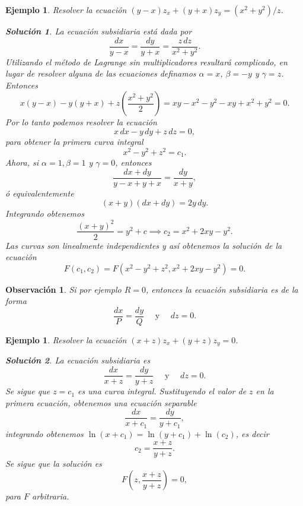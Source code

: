 \documentclass[11pt,letterpaper,draft]{report}
\newtheorem{example}[defn]{Ejemplo}
\newtheorem*{sol}{Solución}
\newtheorem{obs}[defn]{Observación}
\newcommand\<{\langle}
\renewcommand\>{\rangle}
\begin{document}
\begin{example}
  Resolver la ecuación $(y-x) z_x + (y+x) z_y = (x^2+y^2) /
  z$.
  \begin{sol}
    La ecuación subsidiaria está dada por
    \[
    \frac{dx}{y-x} = \frac{dy}{y+x} = \frac{z \,
    dz}{x^2+y^2}.
    \] 
    Utilizando el método de Lagrange sin multiplicadores
    resultará complicado, en lugar de resolver alguna de las
    ecuaciones definamos $\alpha = x$, $\beta = -y$ y
    $\gamma = z$. Entonces
    \[
    x(y-x) - y(y+x) + z\left(\frac{x^2+y^2}{2}\right) = xy -
    x^2 - y^2 - xy + x^2 + y^2 = 0.
    \]
    Por lo tanto podemos resolver la ecuación
    \[
    x \, dx - y \, dy + z \, dz = 0,
    \] 
    para obtener la primera curva integral
    \[
    x^2 - y^2 + z^2 = c_1.
    \] 
    Ahora, si $\alpha = 1, \beta = 1$ y $\gamma = 0$,
    entonces
    \[
    \frac{dx + dy}{y - x + y + x} = \frac{dy}{x + y},
    \] 
    ó equivalentemente
    \[
      (x+y)(dx + dy) = 2y \, dy.
    \] 
    Integrando obtenemos
    \[
    \frac{(x+y)^2}{2} = y^2 + c \implies c_2 = x^2 + 2xy -
    y^2.
    \] 
    Las curvas son linealmente independientes y así
    obtenemos la solución de la ecuación 
    \[
    F(c_1,c_2) = F\left(x^2 - y^2 +
      z^2, x^2 + 2xy - y^2\right) = 0.
    \] 
  \end{sol}
\end{example}

\begin{obs}
  Si por ejemplo $R = 0$, entonces la ecuación subsidiaria
  es de la forma
  \[
  \frac{dx}{P} = \frac{dy}{Q} \quad \text{ y } \quad dz = 0.
  \] 
\end{obs}

\begin{example}
  Resolver la ecuación $(x+z) z_x + (y+z) z_y = 0$.
  \begin{sol}
    La ecuación subsidiaria es
    \[
    \frac{dx}{x+z} = \frac{dy}{y+z} \quad \text{ y } \quad
    dz = 0.
    \] 
    Se sigue que $z = c_1$ es una curva integral.
    Sustituyendo el valor de $z$ en la primera ecuación,
    obtenemos una ecuación separable
    \[
    \frac{dx}{x+c_1} = \frac{dy}{y+c_1},
    \]
    integrando obtenemos $\ln(x+c_1) = \ln(y+c_1) +
    \ln(c_2)$, es decir
    \[
    c_2 = \frac{x+z}{y+z}.
    \] 
    Se sigue que la solución es
    \[
    F\left(z, \frac{x+z}{y+z}\right) = 0,
    \] 
    para $F$ arbitraria.
  \end{sol}
\end{example}
\end{document}
